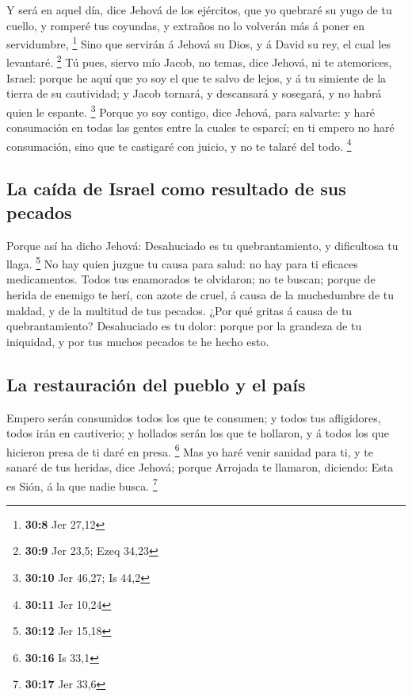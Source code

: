  Y será en aquel día, dice Jehová de los ejércitos, que yo
quebraré su yugo de tu cuello, y romperé tus coyundas, y extraños no lo
volverán más á poner en servidumbre, \footnote{\textbf{30:8} Jer 27,12}
 Sino que servirán á Jehová su Dios, y á David su rey, el
cual les levantaré. \footnote{\textbf{30:9} Jer 23,5; Ezeq 34,23}
 Tú pues, siervo mío Jacob, no temas, dice Jehová, ni te
atemorices, Israel: porque he aquí que yo soy el que te salvo de lejos,
y á tu simiente de la tierra de su cautividad; y Jacob tornará, y
descansará y sosegará, y no habrá quien le espante. \footnote{\textbf{30:10}
  Jer 46,27; Is 44,2}  Porque yo soy contigo, dice
Jehová, para salvarte: y haré consumación en todas las gentes entre la
cuales te esparcí; en ti empero no haré consumación, sino que te
castigaré con juicio, y no te talaré del todo. \footnote{\textbf{30:11}
  Jer 10,24}

\hypertarget{la-cauxedda-de-israel-como-resultado-de-sus-pecados}{%
\subsection{La caída de Israel como resultado de sus
pecados}\label{la-cauxedda-de-israel-como-resultado-de-sus-pecados}}

 Porque así ha dicho Jehová: Desahuciado es tu
quebrantamiento, y dificultosa tu llaga. \footnote{\textbf{30:12} Jer
  15,18}  No hay quien juzgue tu causa para salud: no hay
para ti eficaces medicamentos.  Todos tus enamorados te
olvidaron; no te buscan; porque de herida de enemigo te herí, con azote
de cruel, á causa de la muchedumbre de tu maldad, y de la multitud de
tus pecados.  ¿Por qué gritas á causa de tu
quebrantamiento? Desahuciado es tu dolor: porque por la grandeza de tu
iniquidad, y por tus muchos pecados te he hecho esto.

\hypertarget{la-restauraciuxf3n-del-pueblo-y-el-pauxeds}{%
\subsection{La restauración del pueblo y el
país}\label{la-restauraciuxf3n-del-pueblo-y-el-pauxeds}}

 Empero serán consumidos todos los que te consumen; y
todos tus afligidores, todos irán en cautiverio; y hollados serán los
que te hollaron, y á todos los que hicieron presa de ti daré en presa.
\footnote{\textbf{30:16} Is 33,1}  Mas yo haré venir
sanidad para ti, y te sanaré de tus heridas, dice Jehová; porque
Arrojada te llamaron, diciendo: Esta es Sión, á la que nadie busca.
\footnote{\textbf{30:17} Jer 33,6}


